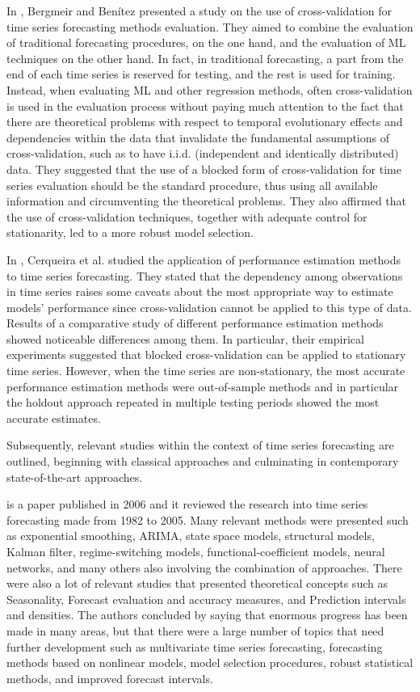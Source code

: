 In \cite{BERGMEIR2012192}, Bergmeir and Benítez presented a study on the use of cross-validation for time series forecasting methods evaluation.
They aimed to combine the evaluation of traditional forecasting procedures, on the one hand, and the evaluation of ML techniques on the other hand.
In fact, in traditional forecasting, a part from the end of each time series is reserved for testing, and the rest is used for training.
Instead, when evaluating ML and other regression methods, often cross-validation is used in the evaluation process without paying much attention to the fact that there are theoretical problems with respect to temporal evolutionary effects and dependencies within the data that invalidate the fundamental assumptions of cross-validation, such as to have i.i.d. (independent and identically distributed) data.
They suggested that the use of a blocked form of cross-validation for time series evaluation should be the standard procedure, thus using all available information and circumventing the theoretical problems.
They also affirmed that the use of cross-validation techniques, together with adequate control for stationarity, led to a more robust model selection.

In \cite{Cerqueira2020}, Cerqueira et al. studied the application of performance estimation methods to time series forecasting.
They stated that the dependency among observations in time series raises some caveats about the most appropriate way to estimate models’ performance since cross-validation cannot be applied to this type of data.
Results of a comparative study of different performance estimation methods showed noticeable differences among them.
In particular, their empirical experiments suggested that blocked cross-validation can be applied to stationary time series.
However, when the time series are non-stationary, the most accurate performance estimation methods were out-of-sample methods and in particular the holdout approach repeated in multiple testing periods showed the most accurate estimates.

Subsequently, relevant studies within the context of time series forecasting are outlined, beginning with classical approaches and culminating in contemporary state-of-the-art approaches.

\cite{DEGOOIJER2006443} is a paper published in 2006 and it reviewed the research into time series forecasting made from 1982 to 2005.
Many relevant methods were presented such as exponential smoothing, ARIMA, state space models, structural models, Kalman filter, regime-switching models, functional-coefficient models, neural networks, and many others also involving the combination of approaches.
There were also a lot of relevant studies that presented theoretical concepts such as Seasonality, Forecast evaluation and accuracy measures, and Prediction intervals and densities.
The authors concluded by saying that enormous progress has been made in many areas, but that there were a large number of topics that need further development such as multivariate time series forecasting, forecasting methods based on nonlinear models, model selection procedures, robust statistical methods, and improved forecast intervals.

